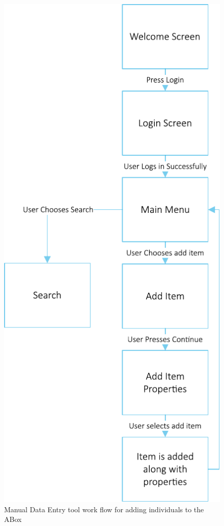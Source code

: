  \begin{figure}[H]
\includegraphics[max width=\linewidth]{gfx/manEntryWorkflow}
\caption{Manual Data Entry tool work flow for adding individuals to the ABox}
\label{fig:mtWorkFlow}
\end{figure}

